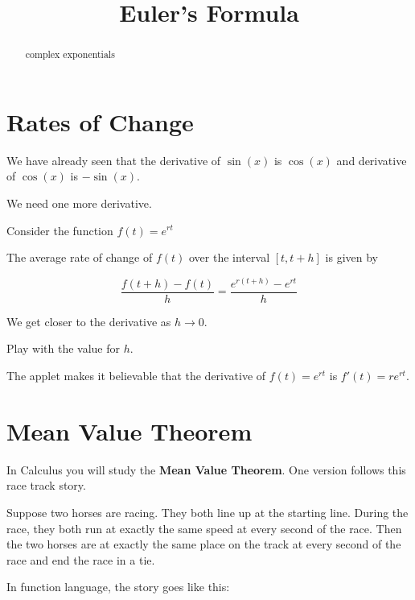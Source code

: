 \documentclass{ximera}
\title{Euler's Formula}
\begin{document}
\begin{abstract}
complex exponentials
\end{abstract}
\maketitle





\section{Rates of Change}

We have already seen that the derivative of $\sin(x)$ is $\cos(x)$ and derivative of $\cos(x)$ is $-\sin(x)$.

We need one more derivative.


Consider the function $f(t) = e^{r t}$

The average rate of change of $f(t)$ over the interval $[t, t+h]$ is given by 

\[   \frac{f(t+h)-f(t)}{h} = \frac{e^{r(t+h)}-e^{r t}}{h}         \]


We get closer to the derivative as $h \to 0$.


\begin{center}
\end{center}

Play with the value for $h$.

The applet makes it believable that the derivative of $f(t) = e^{r t}$  is $f'(t) = r e^{r t}$.





\section{Mean Value Theorem}



In Calculus you will study the \textbf{Mean Value Theorem}. One version follows this race track story.


Suppose two horses are racing.  They both line up at the starting line.  During the race, they both run at exactly the same speed at every second of the race.  Then the two horses are at exactly the same place on the track at every second of the race and end the race in a tie.




In function language, the story goes like this:
\end{document}
